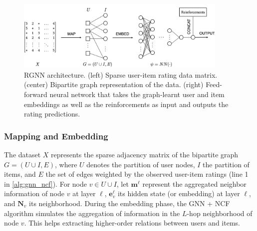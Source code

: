 \begin{figure}
    \centering
    \includegraphics[width=0.9\textwidth]{figures/rgnn_architecture.png}
    \caption{RGNN architecture. (left) Sparse user-item rating data matrix. (center) Bipartite graph representation of the data. (right) Feed-forward neural network that takes the graph-learnt user and item embeddings as well as the reinforcements as input and outputs the rating predictions.}
    \label{fig: model}
\end{figure}

\subsubsection{Mapping and Embedding}\label{mapping_and_embedding} The dataset $X$ represents the sparse adjacency matrix of the bipartite graph $G = (U \cup I, E)$, where $U$ denotes the partition of user nodes, $I$ the partition of items, and $E$ the set of edges weighted by the observed user-item ratings (line 1 in \autoref{alg:gnn_ncf}). For node $v \in U \cup I$, let $\textbf{m}^{\ell}$ represent the aggregated neighbor information of node $v$ at layer $\ell$, $\textbf{e}^{\ell}_v$ its hidden state (or embedding) at layer $\ell$, and $\textbf{N}_v$ its neighborhood. During the embedding phase, the GNN + NCF algorithm simulates the aggregation of information in the $L$-hop neighborhood of node $v$. This helps extracting higher-order relations between users and items.

